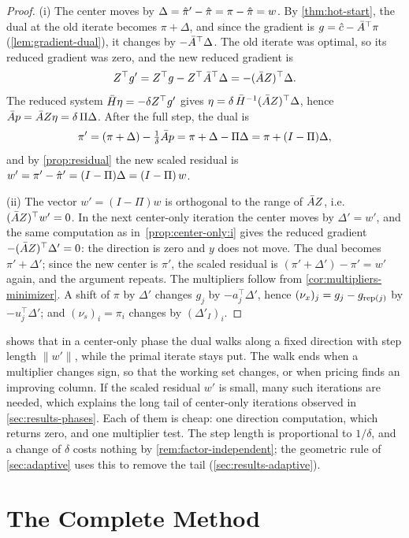\begin{proof}
(i) The center moves by $\Delta = \hat{\pi}' - \hat{\pi} = \pi - \hat{\pi} = w$. By
\cref{thm:hot-start}, the dual at the old iterate becomes $\pi + \Delta$, and since the gradient
is $g = \hat{c} - \bar{A}^\top\pi$ (\cref{lem:gradient-dual}), it changes by $-\bar{A}^\top\Delta$. The
old iterate was optimal, so its reduced gradient was zero, and the new reduced gradient is
\[
Z^\top g' = Z^\top g - Z^\top\bar{A}^\top\Delta = -(\bar{A} Z)^\top\Delta .
\]
The reduced system $\bar{H}\eta = -\delta Z^\top g'$ gives $\eta = \delta\,\bar{H}^{-1}(\bar{A} Z)^\top\Delta$,
hence $\bar{A} p = \bar{A} Z\eta = \delta\,\Pi\Delta$. After the full step, the dual is
\[
\pi' = (\pi + \Delta) - \tfrac{1}{\delta}\bar{A} p = \pi + \Delta - \Pi\Delta = \pi + (I - \Pi)\Delta,
\]
and by \cref{prop:residual} the new scaled residual is $w' = \pi' - \hat{\pi}' = (I-\Pi)\Delta = (I-\Pi)\,w$.

(ii) The vector $w' = (I-\Pi)w$ is orthogonal to the range of $\bar{A} Z$, i.e.\
$(\bar{A} Z)^\top w' = 0$. In the next center-only iteration the center moves by
$\Delta' = w'$, and the same computation as in~\ref{prop:center-only:i} gives the reduced gradient
$-(\bar{A} Z)^\top\Delta' = 0$: the direction is zero and $y$ does not move. The dual becomes
$\pi' + \Delta'$; since the new center is $\pi'$, the scaled residual is
$(\pi'+\Delta') - \pi' = w'$ again, and the argument repeats. The multipliers follow from \cref{cor:multipliers-minimizer}. A shift of $\pi$ by
$\Delta'$ changes $g_j$ by $-a_j^\top\Delta'$, hence $(\nu_x)_j = g_j - g_{\operatorname{rep}(j)}$ by
$-u_j^\top\Delta'$; and $(\nu_s)_i = \pi_i$ changes by $(\Delta'_I)_i$.
\end{proof}

 shows that in a center-only phase the dual walks along a fixed
direction with step length $\lVert w'\rVert$, while the primal iterate stays put. The
walk ends when a multiplier changes sign, so that the working set changes, or when pricing
finds an improving column. If the scaled residual $w'$ is small, many such iterations are needed,
which explains the long tail of center-only iterations observed in \cref{sec:results-phases}.
Each of them is cheap: one direction computation, which returns zero, and one multiplier test.
The step length is proportional to $1/\delta$, and a change of $\delta$ costs nothing by
\cref{rem:factor-independent}; the geometric rule of \cref{sec:adaptive} uses this to remove
the tail (\cref{sec:results-adaptive}).


\section{The Complete Method}
\label{sec:complete}

